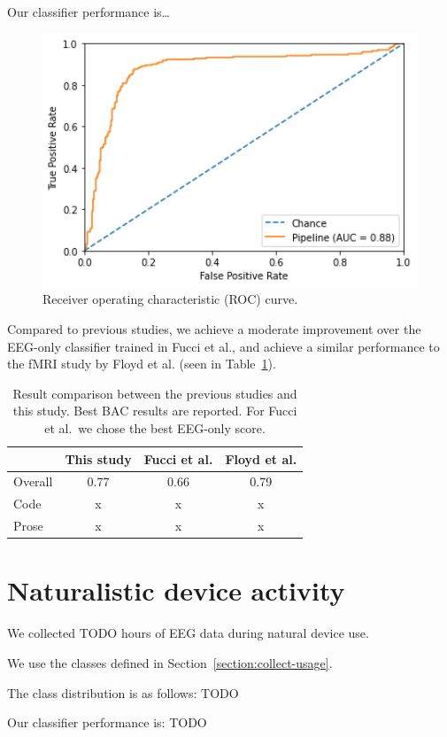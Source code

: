         Our classifier performance is\ldots

        \begin{figure}[h]
        \centering
        \includegraphics[width=12cm]{img/roccurve.png}
        \caption{Receiver operating characteristic (ROC) curve.}\label{fig:roc}
        \end{figure}

        Compared to previous studies, we achieve a moderate improvement over the EEG-only classifier trained in Fucci et al., and achieve a similar performance to the fMRI study by Floyd et al. (seen in Table~\ref{table:compare-results}).

        \begin{table}
            \begin{center}
                \begin{tabular}{lccc}
                    \toprule
                    & \textbf{This study} & \textbf{Fucci et al.} & \textbf{Floyd et al.} \\
                    \midrule
                    Overall & 0.77 & 0.66 & 0.79 \\
                    Code & x & x & x \\
                    Prose & x & x & x \\
                    \bottomrule
                \end{tabular}
                \caption{Result comparison between the previous studies and this study. Best BAC results are reported. For Fucci et al.\ we chose the best EEG-only score.}\label{table:compare-results}
            \end{center}
        \end{table}

    \section{Naturalistic device activity}

        We collected TODO hours of EEG data during natural device use.

        We use the classes defined in Section~\ref{section:collect-usage}.

        The class distribution is as follows: TODO

        Our classifier performance is: TODO


